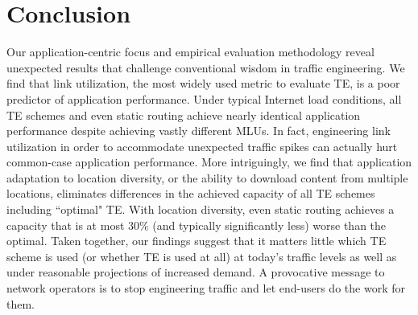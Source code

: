 \section{Conclusion}
\label{sec:conclusion}

Our application-centric focus and empirical evaluation methodology reveal unexpected results that challenge conventional wisdom in traffic engineering. We find that link utilization, the most widely used metric to evaluate TE, is a poor predictor of application performance. Under typical Internet load conditions, all TE schemes and even static routing achieve nearly identical application performance despite achieving vastly different MLUs. In fact, engineering link utilization in order to accommodate unexpected traffic spikes  can actually hurt common-case application performance. More intriguingly, we find that application adaptation to location diversity, or the ability to download content from multiple locations, eliminates differences in the achieved capacity of all TE schemes including ``optimal" TE. With location diversity, even static routing achieves a capacity that is at most 30\% (and typically significantly less) worse than the optimal. Taken together, our findings suggest that it matters little which TE scheme is used (or whether TE is used at all) at today's traffic levels as well as under reasonable projections of increased demand. A provocative message to network operators is to stop engineering traffic and let end-users do the work for them.





